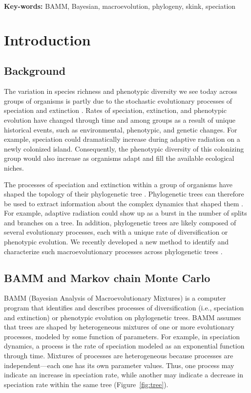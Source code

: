 \documentclass[12pt]{article}
\begin{document}
\begin{flushleft}
\textbf{Key-words:} BAMM, Bayesian, macroevolution, phylogeny, skink, speciation
\end{flushleft}


\pagebreak[4]


\section*{Introduction}

\subsection*{Background}

The variation in species richness and phenotypic diversity we see today
across groups of organisms is partly due to the stochastic
evolutionary processes of speciation and extinction \citep{rab14plos}.
%
Rates of speciation, extinction, and phenotypic evolution
have changed through time and among groups
as a result of unique historical events,
such as environmental, phenotypic, and genetic changes.
%
For example, speciation could dramatically increase
during adaptive radiation on a newly colonized island.
%
Consequently, the phenotypic diversity of this colonizing group
would also increase as organisms adapt and fill
the available ecological niches.


The processes of speciation and extinction within a group of organisms
have shaped the topology of their phylogenetic tree \citep{nee94}.
%
Phylogenetic trees can therefore be used to extract
information about the complex dynamics that shaped them \citep{rab14plos}.
%
For example, adaptive radiation could show up
as a burst in the number of splits and branches on a tree.
%
In addition,
phylogenetic trees are likely composed of several evolutionary processes,
each with a unique rate of diversification or phenotypic evolution.
%
We recently developed a new method to identify and characterize
such macroevolutionary processes across phylogenetic trees \citep{rab14plos}.


\subsection*{BAMM and Markov chain Monte Carlo}

BAMM (Bayesian Analysis of Macroevolutionary Mixtures)
is a computer program that identifies and describes
processes of diversification (i.e., speciation and extinction)
or phenotypic evolution on phylogenetic trees.
%
BAMM assumes that trees are shaped by heterogeneous mixtures
of one or more evolutionary processes,
modeled by some function of parameters.
%
For example, in speciation dynamics,
a process is the rate of speciation
modeled as an exponential function through time.
%
Mixtures of processes are heterogeneous because processes
are independent---each one has its own parameter values.
%
Thus, one process may indicate an increase in speciation rate,
while another may indicate a decrease in speciation rate
within the same tree (Figure~\ref{fig:tree}).
\end{document}
